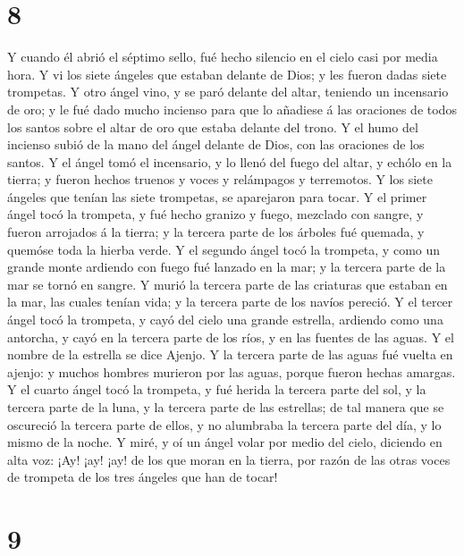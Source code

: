 \hypertarget{section-7}{%
\section{8}\label{section-7}}

 Y cuando él abrió el séptimo sello, fué hecho silencio en
el cielo casi por media hora.  Y vi los siete ángeles que
estaban delante de Dios; y les fueron dadas siete trompetas.
 Y otro ángel vino, y se paró delante del altar, teniendo un
incensario de oro; y le fué dado mucho incienso para que lo añadiese á
las oraciones de todos los santos sobre el altar de oro que estaba
delante del trono.  Y el humo del incienso subió de la mano
del ángel delante de Dios, con las oraciones de los santos. 
Y el ángel tomó el incensario, y lo llenó del fuego del altar, y echólo
en la tierra; y fueron hechos truenos y voces y relámpagos y terremotos.
 Y los siete ángeles que tenían las siete trompetas, se
aparejaron para tocar.  Y el primer ángel tocó la trompeta,
y fué hecho granizo y fuego, mezclado con sangre, y fueron arrojados á
la tierra; y la tercera parte de los árboles fué quemada, y quemóse toda
la hierba verde.  Y el segundo ángel tocó la trompeta, y
como un grande monte ardiendo con fuego fué lanzado en la mar; y la
tercera parte de la mar se tornó en sangre.  Y murió la
tercera parte de las criaturas que estaban en la mar, las cuales tenían
vida; y la tercera parte de los navíos pereció.  Y el
tercer ángel tocó la trompeta, y cayó del cielo una grande estrella,
ardiendo como una antorcha, y cayó en la tercera parte de los ríos, y en
las fuentes de las aguas.  Y el nombre de la estrella se
dice Ajenjo. Y la tercera parte de las aguas fué vuelta en ajenjo: y
muchos hombres murieron por las aguas, porque fueron hechas amargas.
 Y el cuarto ángel tocó la trompeta, y fué herida la
tercera parte del sol, y la tercera parte de la luna, y la tercera parte
de las estrellas; de tal manera que se oscureció la tercera parte de
ellos, y no alumbraba la tercera parte del día, y lo mismo de la noche.
 Y miré, y oí un ángel volar por medio del cielo, diciendo
en alta voz: ¡Ay! ¡ay! ¡ay! de los que moran en la tierra, por razón de
las otras voces de trompeta de los tres ángeles que han de tocar!

\hypertarget{section-8}{%
\section{9}\label{section-8}}

